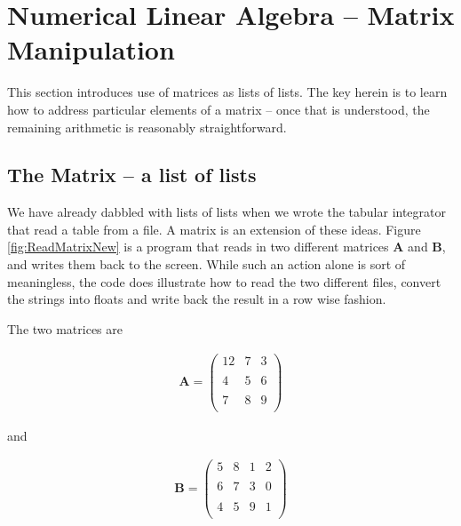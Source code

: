 \section{Numerical Linear Algebra -- Matrix Manipulation}
This section introduces use of matrices as lists of lists.   The key herein is to learn how to address particular elements of a matrix -- once that is understood, the remaining arithmetic is reasonably straightforward.   
\subsection{The Matrix -- a list of lists}
We have already dabbled with lists of lists when we wrote the tabular integrator that read a table from a file.   
A matrix is an extension of these ideas.
Figure \ref{fig:ReadMatrixNew} is a program that reads in two different matrices $\mathbf{A}$ and $\mathbf{B}$, and writes them back to the screen.   While such an action alone is sort of meaningless, the code does illustrate how to read the two different files, convert the strings into floats and write back the result in a row wise fashion.

The two matrices are

\begin{gather}
\mathbf{A} =
\begin{pmatrix}
12 & 7 & 3 \\
~\\
4 & 5 &6 \\
~\\
7 & 8 & 9 \\
\end{pmatrix}
\end{gather}

and 

\begin{gather}
\mathbf{B} =
\begin{pmatrix}
5 & 8 & 1 & 2 \\
~\\
6 & 7 & 3 & 0 \\
~\\
4 & 5 & 9 & 1 \\
\end{pmatrix}
\end{gather}

